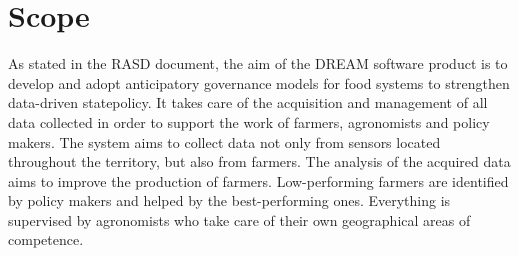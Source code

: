 \section{Scope}
As stated in the RASD document, the aim of the DREAM software product is to develop and adopt anticipatory governance models for food systems to strengthen data-driven statepolicy. It takes care of the acquisition and management of all data collected in order to support the work of farmers, agronomists and policy makers. The system aims to collect data not only from sensors located throughout the territory, but also from farmers. The analysis of the acquired data aims to improve the production of farmers. Low-performing farmers are identified by policy makers and helped by the best-performing ones. Everything is supervised by agronomists who take care of their own geographical areas of competence.
